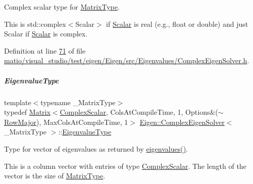 Complex scalar type for \hyperlink{group___eigenvalues___module_ad61f6278843a601096276c9a72c0252f}{Matrix\+Type}. 

This is {\ttfamily std\+::complex$<$\+Scalar$>$} if \hyperlink{group___eigenvalues___module_a61035d40c9498bb1d47628cdd4946785}{Scalar} is real (e.\+g., {\ttfamily float} or {\ttfamily double}) and just {\ttfamily Scalar} if \hyperlink{group___eigenvalues___module_a61035d40c9498bb1d47628cdd4946785}{Scalar} is complex. 

Definition at line \hyperlink{matio_2visual__studio_2test_2eigen_2_eigen_2src_2_eigenvalues_2_complex_eigen_solver_8h_source_l00071}{71} of file \hyperlink{matio_2visual__studio_2test_2eigen_2_eigen_2src_2_eigenvalues_2_complex_eigen_solver_8h_source}{matio/visual\+\_\+studio/test/eigen/\+Eigen/src/\+Eigenvalues/\+Complex\+Eigen\+Solver.\+h}.

\mbox{\label{group___eigenvalues___module_ad3a663b1ff5200a098dabbbf9b7162b1}} 
\subparagraph{\texorpdfstring{Eigenvalue\+Type}{EigenvalueType}\hspace{0.1cm}{\footnotesize\ttfamily [1/2]}}
{\footnotesize\ttfamily template$<$typename \+\_\+\+Matrix\+Type$>$ \\
typedef \hyperlink{group___core___module_class_eigen_1_1_matrix}{Matrix}$<$\hyperlink{group___eigenvalues___module_a3604c99a69fac3bee42c88cb2b589143}{Complex\+Scalar}, Cols\+At\+Compile\+Time, 1, Options\&($\sim$\hyperlink{group__enums_ggaacded1a18ae58b0f554751f6cdf9eb13acfcde9cd8677c5f7caf6bd603666aae3}{Row\+Major}), Max\+Cols\+At\+Compile\+Time, 1$>$ \hyperlink{group___eigenvalues___module_class_eigen_1_1_complex_eigen_solver}{Eigen\+::\+Complex\+Eigen\+Solver}$<$ \+\_\+\+Matrix\+Type $>$\+::\hyperlink{group___eigenvalues___module_ad3a663b1ff5200a098dabbbf9b7162b1}{Eigenvalue\+Type}}



Type for vector of eigenvalues as returned by \hyperlink{group___eigenvalues___module_a10c25c7620e7faedcd39991cce3a757b}{eigenvalues()}. 

This is a column vector with entries of type \hyperlink{group___eigenvalues___module_a3604c99a69fac3bee42c88cb2b589143}{Complex\+Scalar}. The length of the vector is the size of \hyperlink{group___eigenvalues___module_ad61f6278843a601096276c9a72c0252f}{Matrix\+Type}. 

